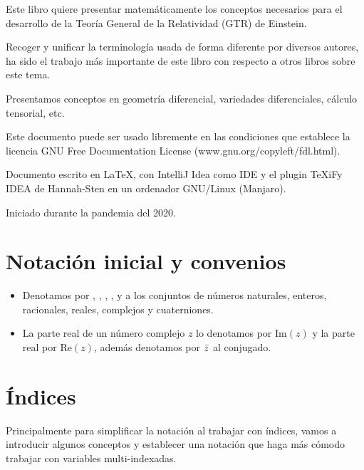 \begin{summary}
Este libro quiere presentar matemáticamente los conceptos necesarios para el desarrollo de la Teoría General de la
Relatividad (GTR) de Einstein.

Recoger y unificar la terminología usada de forma diferente por diversos autores, ha sido el trabajo más importante
de este libro con respecto a otros libros sobre este tema.

Presentamos conceptos en geometría diferencial, variedades diferenciales, cálculo tensorial, etc.

Este documento puede ser usado libremente en las condiciones que establece la licencia GNU Free Documentation License
(www.gnu.org/copyleft/fdl.html).

Documento escrito en \LaTeX, con IntelliJ Idea como IDE y el plugin TeXiFy IDEA
de Hannah-Sten en un ordenador GNU/Linux (Manjaro).

Iniciado durante la pandemia del 2020.
\end{summary}

\section{Notaci\'on inicial y convenios}\label{sec:notacion-inicial-convenios}
\begin{itemize}
  \item Denotamos por , , , ,  y  a los
  conjuntos de números naturales,
  enteros,
  racionales, reales, complejos y cuaterniones.
  \item La parte real de un número complejo $z$ lo denotamos por $\text{Im}(z)$ y la parte real por $\text{Re}(z)$,
  además
  denotamos por $\bar{z}$ al conjugado.
\end{itemize}

\section{\'Indices}\label{sec:indices}
Principalmente para simplificar la notación al trabajar con índices, vamos
a introducir algunos conceptos y establecer una notación que haga más cómodo
trabajar con variables multi-indexadas.


